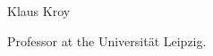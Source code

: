 \begin{participant}[type=R,PM=12,gender=male,salary=5500]{Klaus Kroy}

Professor at the Universität Leipzig.

\end{participant}
